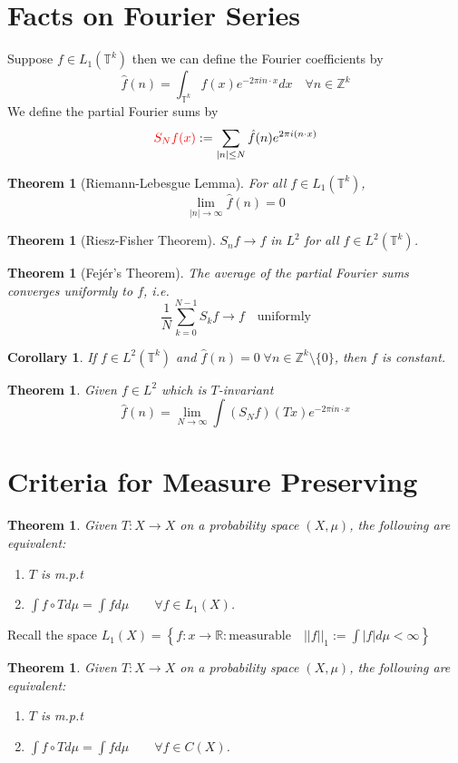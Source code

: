 \documentclass[11pt]{article}
\newcommand{\defeq}{:=}
\newcommand{\abs}[1]{\left|#1\right|}
\newcommand{\norm}[1]{\left|\left|#1\right|\right|}
\newcommand{\ktor}{\mathbb{T}^k}
\newcommand{\R}{\mathbb{R}}
\newcommand{\Z}{\mathbb{Z}}
\newcommand{\mdf}[1]{{\color{red} #1}}
\newtheorem{theorem}[prop]{Theorem}
\newtheorem{cor}[prop]{Corollary}
\begin{document}
\section{Facts on Fourier Series}
Suppose $f\in L_1(\ktor)$ then we can define the \mdf{Fourier coefficients} by
$$\hat{f}(n)=\int_{\ktor}f(x)e^{-2\pi in\cdot x}dx\quad\forall n\in\Z^k$$
We define the \mdf{partial Fourier sums} by
\[
	\mdf{S_Nf(x)}\defeq\sum_{\abs{n}\leq N}\hat{f}(n)e^{2\pi i (n\cdot x)}
\]

\begin{theorem}[Riemann-Lebesgue Lemma]
	For all $f\in L_1(\ktor)$, $$\lim_{\abs{n}\to\infty}\hat{f}(n)=0$$
\end{theorem}
\begin{theorem}[Riesz-Fisher Theorem]
$S_nf\to f$ in $L^2$ for all $f\in L^2(\ktor)$.
\end{theorem}
\begin{theorem}[Fej\'er's Theorem]
The average of the partial Fourier sums converges uniformly to $f$, i.e.
$$\frac{1}{N}\sum_{k=0}^{N-1}S_kf\to f\quad\text{uniformly}$$
\end{theorem}
\begin{cor}
If $f\in L^2(\ktor)$ and $\hat{f}(n)=0\;\forall n\in\Z^k\setminus\{0\}$, then $f$ is constant.
\end{cor}
\begin{theorem}
Given $f\in L^2$ which is $T$-invariant
$$\hat{f}(n)=\lim_{N\to\infty}\int (S_N f)(Tx)e^{-2\pi i n\cdot x}$$
\end{theorem}
\section{Criteria for Measure Preserving}
\begin{theorem}
Given $T:X\to X$ on a probability space $(X,\mu)$, the following are equivalent:
\begin{enumerate}
	\item $T$ is m.p.t
	\item $\int f\circ T d\mu = \int f d\mu \quad\quad \forall f\in L_1(X)$.\end{enumerate}
\end{theorem}
Recall the space $L_1(X)=\left\{ f:x\to\R : \text{measurable}\quad \norm{f}_1 \defeq\int \abs{f} d\mu < \infty \right\}$

\begin{theorem}
Given $T:X\to X$ on a probability space $(X,\mu)$, the following are equivalent:
\begin{enumerate}
	\item $T$ is m.p.t
	\item $\int f\circ T d\mu = \int f d\mu \quad\quad \forall f\in C(X)$.
\end{enumerate}
\end{theorem}
\end{document}
